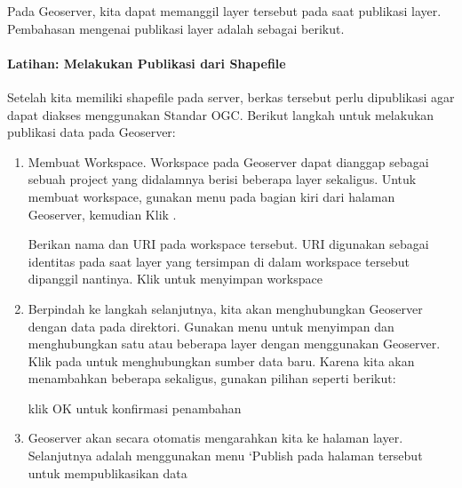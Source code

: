 \documentclass[letterpaper,10pt,english]{sphinxmanual}
\begin{document}
Pada Geoserver, kita dapat memanggil layer tersebut pada saat publikasi layer. Pembahasan mengenai publikasi layer adalah sebagai berikut.


\paragraph{Latihan: Melakukan Publikasi dari Shapefile}
\label{\detokenize{sesi3/publikasi:latihan-melakukan-publikasi-dari-shapefile}}
Setelah kita memiliki shapefile pada server, berkas tersebut perlu dipublikasi agar dapat diakses menggunakan Standar OGC. Berikut langkah untuk melakukan publikasi data pada Geoserver:
\begin{enumerate}
%
\item {} 
Membuat Workspace. Workspace pada Geoserver dapat dianggap sebagai sebuah project yang didalamnya berisi beberapa layer sekaligus. Untuk membuat workspace, gunakan menu  pada bagian kiri dari halaman Geoserver, kemudian Klik .


Berikan nama dan URI pada workspace tersebut. URI digunakan sebagai identitas pada saat layer yang tersimpan di dalam workspace tersebut dipanggil nantinya. Klik  untuk menyimpan workspace

\item {} 
Berpindah ke langkah selanjutnya, kita akan menghubungkan Geoserver dengan data pada direktori. Gunakan menu  untuk menyimpan dan menghubungkan satu atau beberapa layer dengan menggunakan Geoserver. Klik pada  untuk menghubungkan sumber data baru. Karena kita akan menambahkan beberapa  sekaligus, gunakan pilihan  seperti berikut:


klik OK untuk konfirmasi penambahan 

\item {} 
Geoserver akan secara otomatis mengarahkan kita ke halaman layer. Selanjutnya adalah menggunakan menu ‘Publish\textasciigrave{} pada halaman tersebut untuk mempublikasikan data



\end{enumerate}
\end{document}
